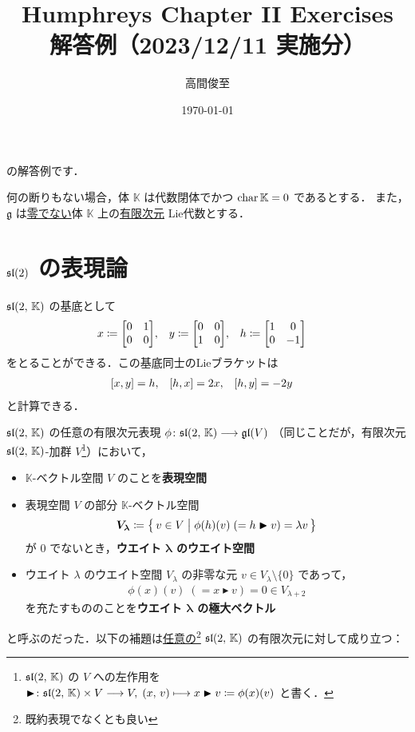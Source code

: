 \documentclass{ltjsarticle}
\theoremstyle{mystyle} %
\numberwithin{equation}{section}
\newcommand{\lto}{\longrightarrow}
\newcommand{\lmto}{\longmapsto}
\newcommand{\btr}{\blacktriangleright}
\begin{document}
\title{Humphreys Chapter II Exercises \\ 解答例（2023/12/11 実施分）}
\author{高間俊至}
\date{\today}
\maketitle

\setcounter{section}{6}

\cite[p.34, Exercise1, 2; p.40, Exercise1, 2, 10]{Humphreys1972introduction}
の解答例です．

何の断りもない場合，体 $\mathbb{K}$ は代数閉体でかつ $\operatorname{char} \mathbb{K} = 0$ であるとする．
また，$\mathfrak{g}$ は\underline{零でない}体 $\mathbb{K}$ 上の\underline{有限次元} Lie代数とする．

\section{$\mathfrak{sl}(2)$ の表現論}

$\mathfrak{sl}(2,\, \mathbb{K})$ の基底として
\begin{align}
    x &\coloneqq \mqty[0 & 1 \\ 0&0], & y &\coloneqq \mqty[0&0 \\ 1 &0], & h &\coloneqq \mqty[1 & 0 \\ 0 & -1]
\end{align}
をとることができる．この基底同士のLieブラケットは
\begin{align}
    \label{eq:comm-sl2}
    \comm{x}{y} &= h, & \comm{h}{x} &= 2x, & \comm{h}{y} &= -2y
\end{align}
と計算できる．

$\mathfrak{sl}(2,\, \mathbb{K})$ の任意の有限次元表現 $\phi \colon \Lsl(2,\, \mathbb{K}) \lto \Lgl(V)$ 
（同じことだが，有限次元 $\mathfrak{sl}(2,\, \mathbb{K})$-加群 $V$\footnote{$\mathfrak{sl}(2,\, \mathbb{K})$ の $V$ への左作用を $\btr \colon \Lsl(2,\, \mathbb{K}) \times V \lto V,\; (x,\, v) \lmto x \btr v \coloneqq \phi(x)(v)$ と書く．}）において，
\begin{itemize}
    \item $\mathbb{K}$-ベクトル空間 $V$ のことを\textbf{表現空間}
    \item 表現空間 $V$ の部分 $\mathbb{K}$-ベクトル空間 
    \begin{align}
        \bm{V_\lambda} \coloneqq \bigl\{\, v \in V \bigm| \phi(h)(v)\; (= h \btr v) = \lambda v \,\bigr\} 
    \end{align}
    が $0$ でないとき，\textbf{ウエイト $\bm{\lambda}$ のウエイト空間}
    \item ウエイト $\lambda$ のウエイト空間 $V_\lambda$ の非零な元 $v \in V_\lambda \setminus \{0\}$ であって，
    \begin{align}
        \phi(x)(v) \; (= x \btr v) = 0 \in V_{\lambda+2}
    \end{align}
    を充たすもののことを\textbf{ウエイト $\bm{\lambda}$ の極大ベクトル}
\end{itemize}
と呼ぶのだった．以下の補題は\underline{任意の}\footnote{既約表現でなくとも良い} $\mathfrak{sl}(2,\, \mathbb{K})$ の有限次元に対して成り立つ：
\end{document}

